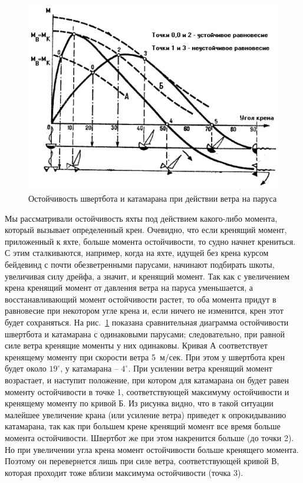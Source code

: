\documentclass[a4paper, 12pt, twoside, final]{scrbook}
\begin{document}
\begin{figure}[htbp]
   \centering
   \includegraphics{82_Ostojchevost_pri_vetre} %
   \caption{Остойчивость швертбота и катамарана при действии ветра на паруса}
   \label{fig:82}
\end{figure}

Мы рассматривали остойчивость яхты под действием какого-либо момента, который вызывает определенный крен. Очевидно, что если кренящий момент, приложенный к яхте, больше момента остойчивости, то судно начнет крениться. С этим сталкиваются, например, когда на яхте, идущей без крена курсом бейдевинд с почти обезветренными парусами, начинают подбирать шкоты, увеличивая силу дрейфа, а значит, и кренящий момент. Так как с увеличением крена кренящий момент от давления ветра на паруса уменьшается, а восстанавливающий момент остойчивости растет, то оба момента придут в равновесие при некотором угле крена и, если ничего не изменится, крен этот будет сохраняться. На рис.~\ref{fig:82} показана сравнительная диаграмма остойчивости швертбота и катамарана с одинаковыми парусами; следовательно, при равной силе ветра кренящие моменты у них одинаковы. Кривая А соответствует кренящему моменту при скорости ветра 5~м/сек. При этом у швертбота крен будет около $19^\circ$, у катамарана \--- $4^\circ$. При усилении ветра кренящий момент возрастает, и наступит положение, при котором для катамарана он будет равен моменту остойчивости в точке 1, соответствующей максимуму остойчивости и кренящему моменту по кривой Б. Из рисунка видно, что в такой ситуации малейшее увеличение крана (или усиление ветра) приведет к опрокидыванию катамарана, так как при большем крене кренящий момент все время больше момента остойчивости. Швертбот же при этом накренится больше (до точки 2). Но при увеличении угла крена момент остойчивости больше кренящего момента. Поэтому он перевернется лишь при силе ветра, соответствующей кривой В, которая проходит тоже вблизи максимума остойчивости (точка 3).
\end{document}
